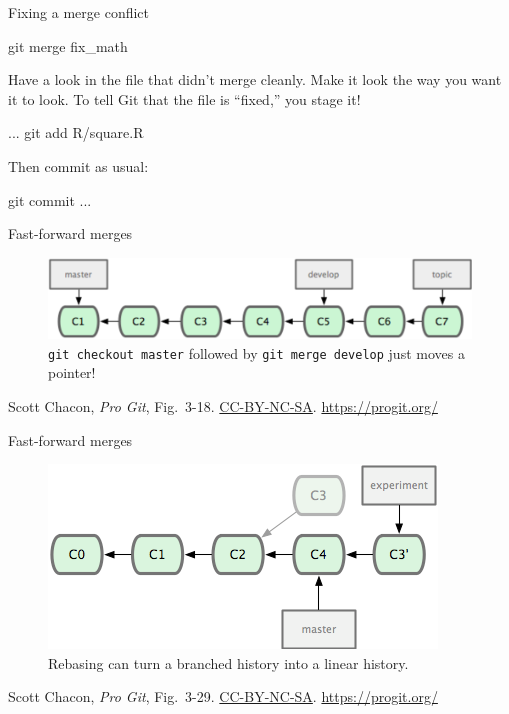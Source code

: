 \begin{frame}[fragile]{Fixing a merge conflict}
  \begin{gitCommand}git merge fix_math\end{gitCommand}

  Have a look in the file that didn't merge cleanly. Make it look the
  way you want it to look. To tell Git that the file is ``fixed,'' you
  stage it!

  \begin{gitCommand}
...
git add R/square.R
  \end{gitCommand}

  Then commit as usual:

  \begin{gitCommand}git commit ...\end{gitCommand}

\end{frame}

\begin{frame}{Fast-forward merges}
  \begin{figure}
    \includegraphics[scale=0.8]{18333fig0318-tn.png}
    \\ \texttt{git checkout master} followed by \texttt{git merge develop}
    just moves a pointer!
  \end{figure}
  \footnotesize{Scott Chacon,
    \emph{Pro Git},
    Fig.~3-18.
    \href{https://creativecommons.org/licenses/by-nc-sa/3.0/legalcode}{CC-BY-NC-SA}.
    \href{https://progit.org/}{https://progit.org/}}
\end{frame}

\begin{frame}{Fast-forward merges}
  \begin{figure}
    \includegraphics[scale=0.8]{18333fig0329-tn.png}
    \\ Rebasing can turn a branched history into a linear history.
  \end{figure}
  \footnotesize{Scott Chacon,
    \emph{Pro Git},
    Fig.~3-29.
    \href{https://creativecommons.org/licenses/by-nc-sa/3.0/legalcode}{CC-BY-NC-SA}.
    \href{https://progit.org/}{https://progit.org/}}
\end{frame}

